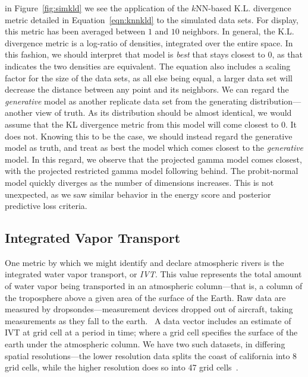 in Figure~\ref{fig:simkld} we see the application of the $k$NN-based K.L. divergence metric detailed
  in Equation~\ref{eqn:knnkld} to the simulated data sets.  For display, this metric has been averaged
  between $1$ and $10$ neighbors.  In general, the K.L. divergence metric is a log-ratio
  of densities, integrated over the entire space.  In this fashion, we should interpret that model
  is \emph{best} that stays closest to 0, as that indicates the two densities are equivalent.  The
  equation also includes a scaling factor for the size of the data sets, as all else being equal, a
  larger data set will decrease the distance between any point and its neighbors.  We can regard the
  \emph{generative} model as another replicate data set from the generating distribution---another
  view of truth.  As its distribution should be almost identical, we would assume that the KL divergence
  metric from this model will come closest to 0.  It does not.  Knowing this to be the case, we should
  instead regard the generative model as truth, and treat as best the model which comes closest to the
  \emph{generative} model.  In this regard, we observe that the projected gamma model comes closest,
  with the projected restricted gamma model following behind.  The probit-normal model quickly diverges
  as the number of dimensions increases.  This is not unexpected, as we saw similar behavior in the
  energy score and posterior predictive loss criteria.

\subsection{Integrated Vapor Transport}
One metric by which we might identify and declare atmospheric rivers is the integrated water vapor
  transport, or \emph{IVT}.  This value represents the total amount of water
  vapor being transported in an atmospheric column---that is, a column of the troposphere above a given
  area of the surface of the Earth. Raw data are measured by dropsondes---measurement devices dropped
  out of aircraft, taking measurements as they fall to the earth.~\citep{ralph2017}  A data vector
  includes an estimate of IVT at grid cell at a period in time; where a grid cell specifies the surface
  of the earth under the atmospheric column.  We have two such datasets, in differing spatial
  resolutions---the lower resolution data splits the coast of california into 8 grid cells, while the
  higher resolution does so into 47 grid cells~\citep{guan2015}.

